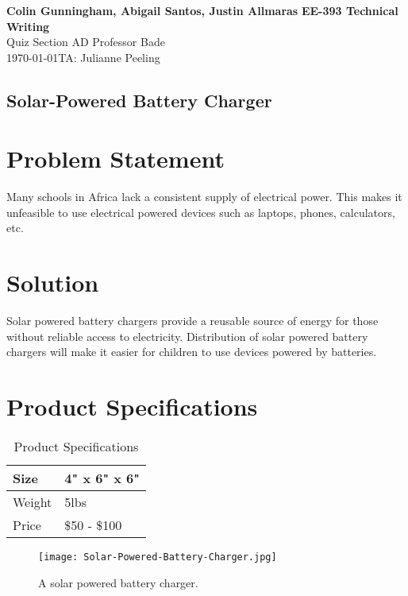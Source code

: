 \documentclass[letterpaper, 11pt]{article}
\begin{document}
\noindent
\large\textbf{Colin Gunningham, Abigail Santos, Justin Allmaras} \hfill \textbf{EE-393 Technical Writing} \\
\normalsize Quiz Section AD \hfill Professor Bade\\
 \hfill \today \hfill TA: Julianne Peeling\\

\begin{center}
\section*{Solar-Powered Battery Charger}
\end{center}

\section*{Problem Statement}
Many schools in Africa lack a consistent supply of electrical power. This makes it unfeasible to use electrical powered devices such as laptops, phones, calculators, etc. 

\section*{Solution}
Solar powered battery chargers provide a reusable source of energy for those without reliable access to electricity. Distribution of solar powered battery chargers will make it easier for children to use devices powered by batteries. 


\section*{Product Specifications}
\begin{table}[h]
\centering
\begin{tabular}{|l|l|}
\hline
Size  & 4" x 6" x 6" \\
\hline
Weight  & 5lbs \\
\hline
Price & \$50 - \$100 \\
\hline

\end{tabular}
\label{my-label}
\caption{Product Specifications}
\end{table}


\begin{figure}[h]
\centering
\texttt{[image: Solar-Powered-Battery-Charger.jpg]}
\caption{A solar powered battery charger.}
\label{fig:pic1}
\end{figure}
\end{document}

